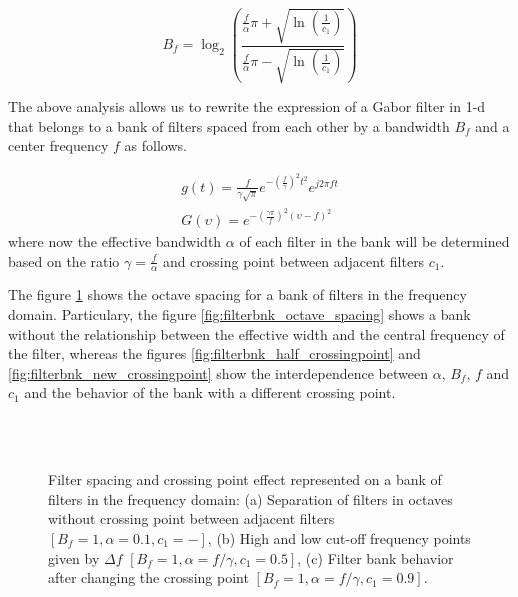 \begin{equation}\label{eq:frequency_bandwidth}
    B_f = \log_2 \left( \frac{ \frac{f}{\alpha} \pi + \sqrt{\ln \left(\frac{1}{c_1}\right)} }{ \frac{f}{\alpha} \pi - \sqrt{\ln \left(\frac{1}{c_1}\right)} } \right)
\end{equation}


The above analysis allows us to rewrite the expression of a Gabor filter in 1-d that belongs to a bank of filters spaced from each other by a bandwidth $B_f$ and a center frequency $f$ as follows. 

\begin{equation}\label{eq:gabor_function_1d_timefreq_bank}
    \begin{gathered}
         g(t) =  \frac{f}{\gamma \sqrt{\pi}} e ^{-\left(\frac{f}{\gamma}\right)^2 t^2} e ^{j 2 \pi f t } \\
         G(\upsilon) =  e ^{-\left(\frac{\gamma \pi}{f}\right) ^2 (\upsilon-f)^2}
     \end{gathered}
\end{equation}
where now the effective bandwidth $\alpha$ of each filter in the bank will be determined based on the ratio $\gamma = \frac{f}{\alpha}$ and crossing point between adjacent filters $c_1$.

The figure \ref{fig:1d_filterbank_spacing} shows the octave spacing for a bank of filters in the frequency domain. Particulary, the figure \ref{fig:filterbnk_octave_spacing} shows a bank without the relationship between the effective width and the central frequency of the filter, whereas the figures \ref{fig:filterbnk_half_crossingpoint} and \ref{fig:filterbnk_new_crossingpoint} show the interdependence between $\alpha$, $B_f$, $f$ and $c_1$ and the behavior of the bank with a different crossing point.

\begin{figure}
\centering
     \\
    \\
\caption{Filter spacing and crossing point effect represented on a bank of filters in the frequency domain: (a) Separation of filters in octaves without crossing point between adjacent filters $[B_f=1, \alpha=0.1, c_1=-]$, (b) High and low cut-off frequency points given by $\Delta f$ $[B_f=1, \alpha=f/\gamma, c_1=0.5]$, (c) Filter bank behavior after changing the crossing point $[B_f=1, \alpha=f/\gamma, c_1=0.9]$.}\label{fig:1d_filterbank_spacing}
\end{figure}

